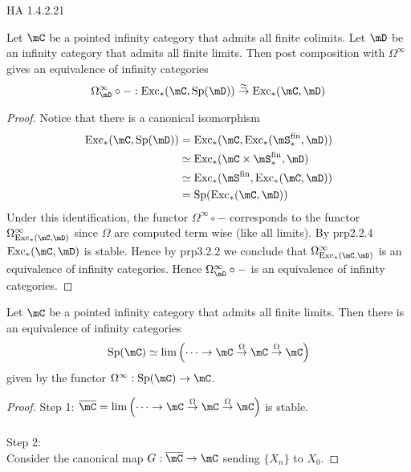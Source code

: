\documentclass[a4paper]{article}
\begin{document}
HA 1.4.2.21

\begin{prp}{}{} Let $\mC$ be a pointed infinity category that admits all finite colimits. Let $\mD$ be an infinity category that admits all finite limits. Then post composition with $\Omega^\infty$ gives an equivalence of infinity categories $$\Omega_\mD^\infty\circ-:\text{Exc}_\ast(\mC,\text{Sp}(\mD))\overset{\simeq}{\rightarrow}\text{Exc}_\ast(\mC,\mD)$$ \tcbline
\begin{proof}
Notice that there is a canonical isomorphism 
\begin{align*}
\text{Exc}_\ast(\mC,\text{Sp}(\mD))&=\text{Exc}_\ast(\mC,\text{Exc}_\ast(\mS_\ast^\text{fin},\mD))\\
&\simeq\text{Exc}_\ast(\mC\times\mS_\ast^\text{fin},\mD)\\
&\simeq\text{Exc}_\ast(\mS^\text{fin},\text{Exc}_\ast(\mC,\mD))\\
&=\text{Sp}(\text{Exc}_\ast(\mC,\mD))
\end{align*}
Under this identification, the functor $\Omega^\infty\circ -$ corresponds to the functor $\Omega_{\text{Exc}_\ast(\mC,\mD)}^\infty$ since $\Omega$ are computed term wise (like all limits). By prp2.2.4 $\text{Exc}_\ast(\mC,\mD)$ is stable. Hence by prp3.2.2 we conclude that $\Omega_{\text{Exc}_\ast(\mC,\mD)}^\infty$ is an equivalence of infinity categories. Hence $\Omega_\mD^\infty\circ-$ is an equivalence of infinity categories. 
\end{proof}
\end{prp}

\begin{prp}{}{} Let $\mC$ be a pointed infinity category that admits all finite limits. Then there is an equivalence of infinity categories $$\text{Sp}(\mC)\simeq\lim\left(\cdots\rightarrow\mC\overset{\Omega}{\rightarrow}\mC\overset{\Omega}{\rightarrow}\mC\right)$$ given by the functor $\Omega^\infty:\text{Sp}(\mC)\to\mC$. \tcbline
\begin{proof}
Step 1: $\overline{\mC}=\lim\left(\cdots\rightarrow\mC\overset{\Omega}{\rightarrow}\mC\overset{\Omega}{\rightarrow}\mC\right)$ is stable. \\~\\

Step 2: \\
Consider the canonical map $G:\overline{\mC}\to\mC$ sending $\{X_n\}$ to $X_0$. 
\end{proof}
\end{prp}
\end{document}
